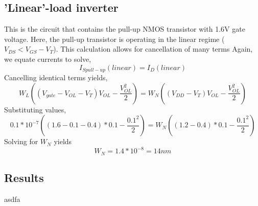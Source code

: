 \documentclass[12pt]{article}
\begin{document}
\subsection*{'Linear'-load inverter}
This is the circuit that contains the pull-up NMOS transistor with 1.6V gate voltage. Here, the pull-up transistor
is operating in the linear regime ($V_{DS} < V_{GS} - V_T$). This calculation allows for cancellation of many terms
Again, we equate currents to solve,
\[ I_{S pull-up}(linear) = I_{D}(linear)\]
Cancelling identical terms yields,
\[W_L ((V_{gate} - V_{OL} - V_T) V_{OL} - \frac{V_{OL}^2}{2}) = W_N ((V_{DD} - V_T) V_{OL} - \frac{V_{OL}^2}{2}) \]
Substituting values,
\[0.1*10^{-7} ((1.6 - 0.1 - 0.4)*0.1 - \frac{0.1^2}{2}) = W_N ((1.2 - 0.4)*0.1 - \frac{0.1^2}{2}) \]
Solving for $W_N$ yields 
\[ W_N = 1.4*10^{-8} = 14nm\]

\subsection{Results}
asdfa
\pagebreak
\end{document}
